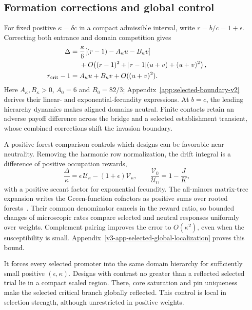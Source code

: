 \documentclass[aps,pre,reprint,amsmath,amssymb,longbibliography]{revtex4-2}
\begin{document}
\subsection{Formation corrections and global control}
For fixed positive $\kappa=\delta c$ in a compact admissible interval,
write $r=b/c=1+\epsilon$. Correcting both entrance and domain competition gives
\begin{align}
 \Delta={}&\frac{\kappa}{6}
       [(r-1)-A_\kappa u-B_\kappa v]\notag\\
 &+O\!\left((r-1)^2+|r-1|(u+v)+(u+v)^2\right),\notag\\
 r_{\rm crit}-1={}&A_\kappa u+B_\kappa v+O((u+v)^2).
 \label{eq:selected-boundary-v2}
\end{align}
Here $A_\kappa,B_\kappa>0$, $A_0=6$ and $B_0=82/3$;
Appendix~\ref{app:selected-boundary-v2} derives their linear- and
exponential-fecundity expressions. At $b=c$, the leading hierarchy dynamics makes aligned domains neutral.
Finite contacts retain an adverse payoff difference across the bridge
and a selected establishment transient, whose combined corrections
shift the invasion boundary.

A positive-forest comparison controls which designs can be favorable
near neutrality. Removing the harmonic row normalization, the drift
integral is a difference of positive occupation rewards,
\begin{equation}
 \frac{\Delta}{\kappa}
 =\epsilon\,\mathcal U_\kappa-(1+\epsilon)\mathcal V_\kappa,
 \qquad
 \frac{\mathcal V_0}{\mathcal U_0}=1-\frac JK,
 \label{eq:v4-positive-rewards}
\end{equation}
with a positive secant factor for exponential fecundity. The
all-minors matrix-tree expansion writes the Green-function cofactors
as positive sums over rooted forests~\cite{AGNamGunawardena2025}.
Their common denominator cancels in the reward ratio, so bounded
changes of microscopic rates compare selected and neutral responses
uniformly over weights. Complement pairing improves the error to
$O(\kappa^2)$, even when the susceptibility is small.
Appendix~\ref{v3-app-selected-global-localization} proves this bound.

It forces every selected promoter into the same domain hierarchy for
sufficiently small positive $(\epsilon,\kappa)$. Designs with contrast
no greater than a reflected selected trial lie in a compact scaled
region. There, core saturation and pin uniqueness make the selected
critical branch globally reflected. This control is local in selection
strength, although unrestricted in positive weights.
\end{document}
